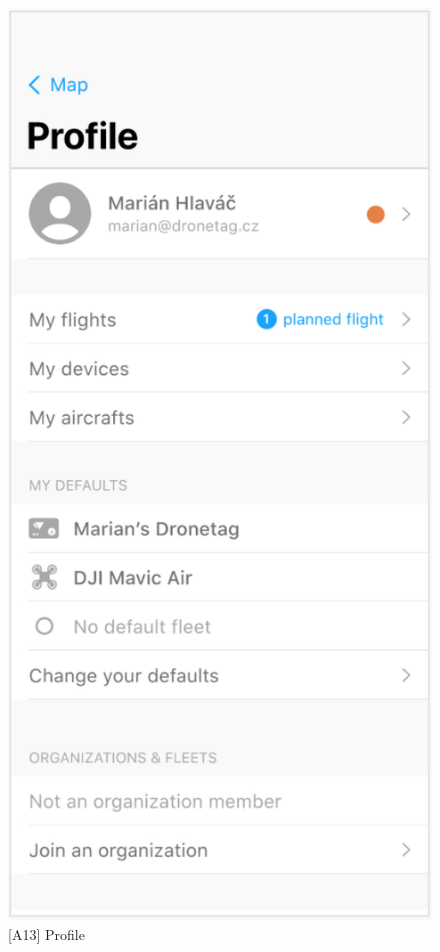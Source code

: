 \begin{figure}
    \centering
    \begin{minipage}{.45\textwidth}
        \centering
        \includegraphics[width=.7\linewidth]{assets/user_interface_design/profile/profile.png}
        \caption{[A13] Profile}
        \label{fig:profile}
    \end{minipage}%
    \hspace{.05\linewidth}
    \begin{minipage}{.45\textwidth}
        \centering

\end{minipage}
\end{figure}
